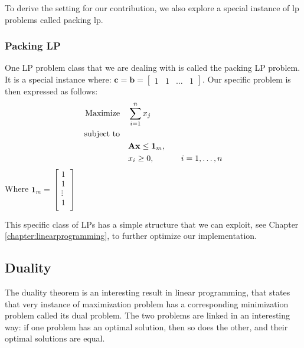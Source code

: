 To derive the setting for our contribution,
we also explore a special instance of \gls{lp} problems called packing \gls{lp}.
\subsubsection{Packing LP}
One LP problem class that we are dealing with is called the packing LP problem. It is a special instance where:
\( \mathbf{c}  = \mathbf{b} =  \begin{bmatrix}
    1 & 1 & \dots & 1
\end{bmatrix} \).
Our specific problem is then expressed as follows:
\begin{align}
    \text{Maximize} \quad   & \sum_{i=1}^{n} x_j \notag                                                             \\
    \text{subject to} \quad & \notag                                                                                \\
                            & \mathbf{A} \mathbf{x} \leq \mathbf{1}_m, \quad                                        \\
                            & x_i \geq 0, \quad                              & i = 1, \ldots, n \label{PLP_Problem}
\end{align}
Where $\mathbf{1}_m = \begin{bmatrix}
        1      \\
        1      \\
        \vdots \\
        1      \\
    \end{bmatrix}$

This specific class of LPs has a simple structure that we can exploit, see
Chapter \ref*{chapter:linearprogramming},
to further optimize our implementation.

\subsection{Duality}\label{duality}

The duality theorem is an interesting result in linear programming, that
states that very instance of maximization problem has a corresponding
minimization problem called its dual problem.
The two problems are linked in an interesting way:
if one problem has an optimal solution, then so does the other,
and their optimal solutions are equal.

